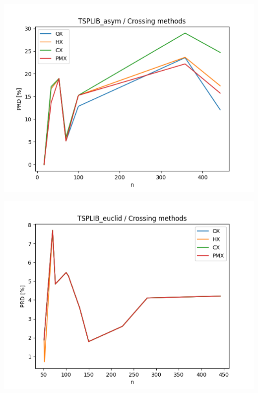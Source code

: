 \documentclass{article}
\begin{document}
\begin{center}
\includegraphics[width=\textwidth, 
                   height = 0.4\textheight, 
                   keepaspectratio]
                  {plots/tsplib_asym_5_crossing} 
\end{center}

\begin{center}
\includegraphics[width=\textwidth, 
                   height = 0.4\textheight, 
                   keepaspectratio]
                  {plots/tsplib_euclid_5_crossing} 
\end{center}
\end{document}
